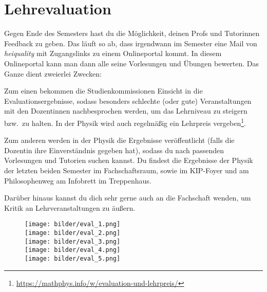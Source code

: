 \section{Lehrevaluation}
\label{eval}

Gegen Ende des Semesters hast du die Möglichkeit, deinen Profs und Tutorinnen Feedback zu geben. Das läuft so ab, dass irgendwann im Semester eine Mail von \textit{heiquality} mit Zugangslinks zu einem Onlineportal kommt. In diesem Onlineportal kann man dann alle seine Vorlesungen und Übungen bewerten.
Das Ganze dient zweierlei Zwecken:

Zum einen bekommen die Studienkommissionen Einsicht in die Evaluationsergebnisse, sodass besonders schlechte (oder gute) Veranstaltungen mit den Dozentinnen nachbesprochen werden, um das Lehrniveau zu steigern bzw.\ zu halten. In der Physik wird auch regelmäßig ein Lehrpreis vergeben\footnote{\url{https://mathphys.info/w/evaluation-und-lehrpreis/}}.

Zum anderen werden in der Physik die Ergebnisse veröffentlicht (falls die Dozentin ihre Einverständnis gegeben hat), sodass du nach passenden Vorlesungen und Tutorien suchen kannst. Du findest die Ergebnisse der Physik der letzten beiden Semester \zB im Fachschaftsraum, sowie im \gls{KIP}-Foyer und am Philosophenweg am Infobrett im Treppenhaus.

Darüber hinaus kannst du dich sehr gerne auch an die Fachschaft wenden, um Kritik an Lehrveranstaltungen zu äußern.

\begin{figure}[h]
    \begin{center}
        \texttt{[image: bilder/eval\_1.png]}\\
        \texttt{[image: bilder/eval\_2.png]}\\
        \texttt{[image: bilder/eval\_3.png]}\\
        \texttt{[image: bilder/eval\_4.png]}\\
        \texttt{[image: bilder/eval\_5.png]}\\
    \end{center}
\end{figure}

\vfill
